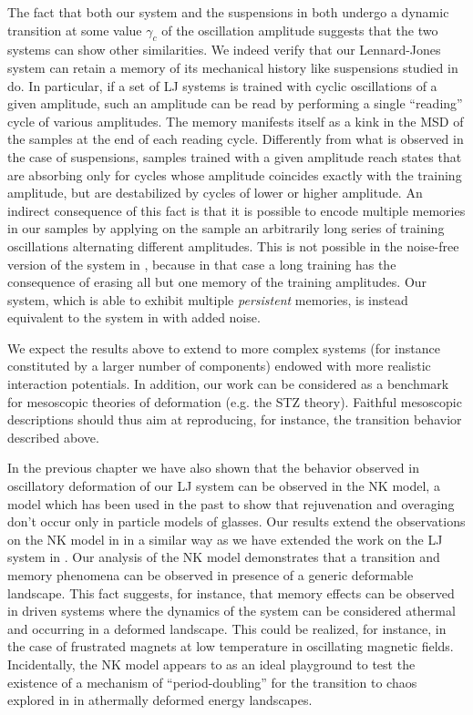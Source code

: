 The fact that both our system and the suspensions in \cite{corte2008random} both undergo a dynamic transition at some value $\gamma_{c}$ of the oscillation amplitude suggests that the two systems can show other similarities. 
We indeed verify that our Lennard-Jones system can retain a memory of its mechanical history like suspensions studied in \cite{keim2011generic} do. In particular, if a set of LJ systems is trained with cyclic oscillations of a given amplitude, such an amplitude can be read by performing a single ``reading'' cycle of various amplitudes. The memory manifests itself as a kink in the MSD of the samples at the end of each reading cycle. Differently from what is observed in the case of suspensions, samples trained with a given amplitude reach states that are absorbing only for cycles whose amplitude coincides exactly with the training amplitude, but are destabilized by cycles of lower or higher amplitude. An indirect consequence of this fact is that it is possible to encode multiple memories in our samples by applying on the sample an arbitrarily long series of training oscillations alternating different amplitudes. This is not possible in the noise-free version of the system in \cite{keim2011generic}, because in that case a long training has the consequence of erasing all but one memory of the training amplitudes. Our system, which is able to exhibit multiple \emph{persistent} memories, is instead equivalent to the system in \cite{keim2011generic} with added noise. 

We expect the results above to extend to more complex systems (for instance constituted by a larger number of components) endowed with more realistic interaction potentials. In addition, our work can be considered as a benchmark for mesoscopic theories of deformation (e.g. the STZ theory). Faithful mesoscopic descriptions should thus aim at reproducing, for instance, the transition behavior described above. 

In the previous chapter we have also shown that the behavior observed in oscillatory deformation of our LJ system can be observed in the NK model, a model which has been used in the past \cite{isner2006generic} to show that rejuvenation and overaging don't occur only in particle models of glasses. Our results extend the observations on the NK model in \cite{isner2006generic} in a similar way as we have extended the work on the LJ system in \cite{lacks2004energy}. Our analysis of the NK model demonstrates that a transition and memory phenomena can be observed in presence of a generic deformable landscape. This fact suggests, for instance, that memory effects can be observed in driven systems where the dynamics of the system can be considered athermal and occurring in a deformed landscape. This could be realized, for instance, in the case of frustrated magnets at low temperature in oscillating magnetic fields.
Incidentally, the NK model appears to as an ideal playground to test the existence of a mechanism of ``period-doubling'' for the transition to chaos explored in \cite{regev2013onset} in athermally deformed energy landscapes.

